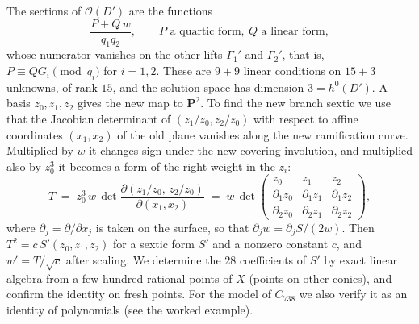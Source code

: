 \documentclass[11pt]{article}
\newcommand{\PP}{\mathbf{P}}
\newcommand{\X}{X}
\theoremstyle{remark}
\begin{document}
The sections of $\mathcal O(D')$ are the functions
\[
\frac{P+Q\,w}{q_1q_2},\qquad P \text{ a quartic form},\ Q \text{ a linear form},
\]
whose numerator vanishes on the other lifts $\Gamma_1'$ and $\Gamma_2'$, that is, $P\equiv QG_i \pmod{q_i}$ for $i=1,2$.
These are $9+9$ linear conditions on $15+3$ unknowns, of rank $15$, and the solution space has dimension $3=h^0(D')$.  A basis
$z_0,z_1,z_2$ gives the new map to $\PP^2$.  To find the new branch sextic we use that the Jacobian determinant of
$(z_1/z_0,z_2/z_0)$ with respect to affine coordinates $(x_1,x_2)$ of the old plane vanishes along the new ramification curve.
Multiplied by $w$ it changes sign under the new covering involution, and multiplied also by $z_0^3$ it becomes a form of the
right weight in the $z_i$:
\[
T \;=\; z_0^3\,w\,\det\frac{\partial(z_1/z_0,\,z_2/z_0)}{\partial(x_1,x_2)}
\;=\; w\,\det\begin{pmatrix} z_0&z_1&z_2\\ \partial_1z_0&\partial_1z_1&\partial_1z_2\\ \partial_2z_0&\partial_2z_1&\partial_2z_2\end{pmatrix},
\]
where $\partial_j=\partial/\partial x_j$ is taken on the surface, so that $\partial_jw=\partial_jS/(2w)$.  Then
$T^2=c\,S'(z_0,z_1,z_2)$ for a sextic form $S'$ and a nonzero constant $c$, and $w'=T/\sqrt c$ after scaling.
We determine the $28$ coefficients of $S'$ by exact linear algebra from a few hundred rational points of
$\X$ (points on other conics), and confirm the identity on fresh points.  For the model of $C_{738}$ we also verify it as an
identity of polynomials (see the worked example).
\end{document}
